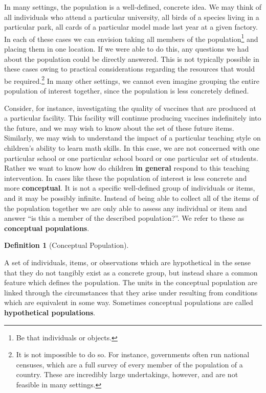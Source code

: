\documentclass[
  letterpaper,
  DIV=11,
  numbers=noendperiod]{scrreprt}
\theoremstyle{definition}
\theoremstyle{definition}
\theoremstyle{definition}
\newtheorem{definition}{Definition}[chapter]
\theoremstyle{remark}
\begin{document}
In many settings, the population is a well-defined, concrete idea. We
may think of all individuals who attend a particular university, all
birds of a species living in a particular park, all cards of a
particular model made last year at a given factory. In each of these
cases we can envision taking all members of the population\footnote{Be
  that individuals or objects.} and placing them in one location. If we
were able to do this, any questions we had about the population could be
directly answered. This is not typically possible in these cases owing
to practical considerations regarding the resources that would be
required.\footnote{It is not impossible to do so. For instance,
  governments often run national censuses, which are a full survey of
  every member of the population of a country. These are incredibly
  large undertakings, however, and are not feasible in many settings.}
In many other settings, we cannot even imagine grouping the entire
population of interest together, since the population is less concretely
defined.

Consider, for instance, investigating the quality of vaccines that are
produced at a particular facility. This facility will continue producing
vaccines indefinitely into the future, and we may wish to know about the
set of these future items. Similarly, we may wish to understand the
impact of a particular teaching style on children's ability to learn
math skills. In this case, we are not concerned with one particular
school or one particular school board or one particular set of students.
Rather we want to know how do children \textbf{in general} respond to
this teaching intervention. In cases like these the population of
interest is less concrete and more \textbf{conceptual}. It is not a
specific well-defined group of individuals or items, and it may be
possibly infinite. Instead of being able to collect all of the items of
the population together we are only able to assess any individual or
item and answer ``is this a member of the described population?''. We
refer to these as \textbf{conceptual populations}.

\begin{definition}[Conceptual
Population]\protect\hypertarget{def-conceptual-pop}{}\label{def-conceptual-pop}

A set of individuals, items, or observations which are hypothetical in
the sense that they do not tangibly exist as a concrete group, but
instead share a common feature which defines the population. The units
in the conceptual population are linked through the circumstances that
they arise under resulting from conditions which are equivalent in some
way. Sometimes conceptual populations are called \textbf{hypothetical
populations}.

\end{definition}
\end{document}
